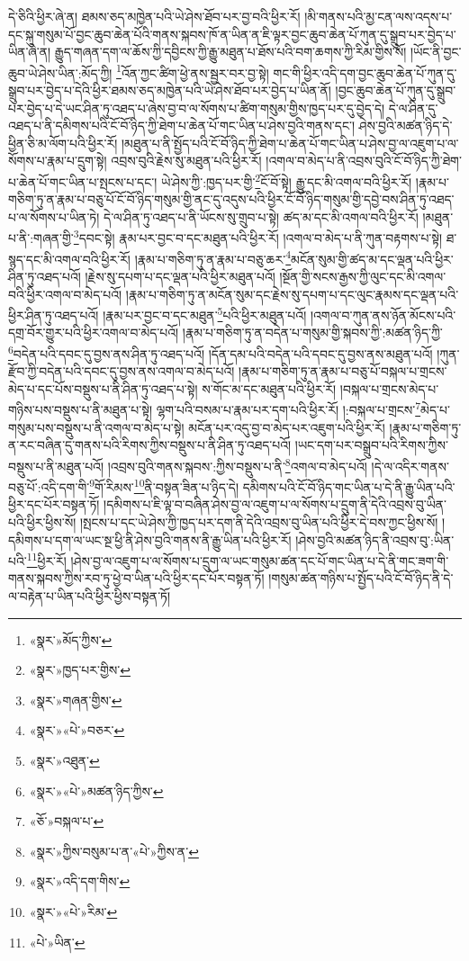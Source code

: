 དེ་ཅིའི་ཕྱིར་ཞེ་ན། ཐམས་ཅད་མཁྱེན་པའི་ཡེ་ཤེས་ཐོབ་པར་བྱ་བའི་ཕྱིར་རོ། །མི་གནས་པའི་མྱ་ངན་ལས་འདས་པ་དང་སྐུ་གསུམ་པོ་བྱང་ཆུབ་ཆེན་པོའི་གནས་སྐབས་ཁོ་ན་ཡིན་ན་ཇི་ལྟར་བྱང་ཆུབ་ཆེན་པོ་ཀུན་དུ་སྒྲུབ་པར་བྱེད་པ་ཡིན་ཞེ་ན། རྒྱུད་གཞན་དག་ལ་ཆོས་ཀྱི་དབྱིངས་ཀྱི་རྒྱུ་མཐུན་པ་ཐོས་པའི་བག་ཆགས་ཀྱི་རིམ་གྱིས་སོ། །ཡོང་ནི་བྱང་ཆུབ་ཡེ་ཤེས་ཡིན་:མོད་ཀྱི། \footnote{«སྣར་»མོད་ཀྱིས་}འོན་ཀྱང་ཚིག་ཕྱེ་ནས་སྦྱར་བར་བྱ་སྟེ། གང་གི་ཕྱིར་འདི་དག་བྱང་ཆུབ་ཆེན་པོ་ཀུན་དུ་སྒྲུབ་པར་བྱེད་པ་དེའི་ཕྱིར་ཐམས་ཅད་མཁྱེན་པའི་ཡེ་ཤེས་ཐོབ་པར་བྱེད་པ་ཡིན་ནོ། །བྱང་ཆུབ་ཆེན་པོ་ཀུན་དུ་སྒྲུབ་པར་བྱེད་པ་དེ་ཡང་ཤིན་ཏུ་འཐད་པ་ཞེས་བྱ་བ་ལ་སོགས་པ་ཚིག་གསུམ་གྱིས་ཁྱད་པར་དུ་བྱེད་དེ། དེ་ལ་ཤིན་དུ་འཐད་པ་ནི་དམིགས་པའི་ངོ་བོ་ཉིད་ཀྱི་ཐེག་པ་ཆེན་པོ་གང་ཡིན་པ་ཤེས་བྱའི་གནས་དང་། ཤེས་བྱའི་མཚན་ཉིད་དེ་ཕྱིན་ཅི་མ་ལོག་པའི་ཕྱིར་རོ། །མཐུན་པ་ནི་སྤྱོད་པའི་ངོ་བོ་ཉིད་ཀྱི་ཐེག་པ་ཆེན་པོ་གང་ཡིན་པ་ཤེས་བྱ་ལ་འཇུག་པ་ལ་སོགས་པ་རྣམ་པ་དྲུག་སྟེ། འབྲས་བུའི་རྗེས་སུ་མཐུན་པའི་ཕྱིར་རོ། །འགལ་བ་མེད་པ་ནི་འབྲས་བུའི་ངོ་བོ་ཉིད་ཀྱི་ཐེག་པ་ཆེན་པོ་གང་ཡིན་པ་སྤངས་པ་དང་། ཡེ་ཤེས་ཀྱི་:ཁྱད་པར་གྱི་\footnote{«སྣར་»ཁྱད་པར་གྱིས་}ངོ་བོ་སྟེ། རྒྱུ་དང་མི་འགལ་བའི་ཕྱིར་རོ། །རྣམ་པ་གཅིག་ཏུ་ན་རྣམ་པ་བཅུ་པོ་ངོ་བོ་ཉིད་གསུམ་གྱི་ནང་དུ་འདུས་པའི་ཕྱིར་ངོ་བོ་ཉིད་གསུམ་གྱི་དབྱེ་བས་ཤིན་ཏུ་འཐད་པ་ལ་སོགས་པ་ཡིན་ཏེ། དེ་ལ་ཤིན་ཏུ་འཐད་པ་ནི་ཡོངས་སུ་གྲུབ་པ་སྟེ། ཚད་མ་དང་མི་འགལ་བའི་ཕྱིར་རོ། །མཐུན་པ་ནི་:གཞན་གྱི་\footnote{«སྣར་»གཞན་གྱིས་}དབང་སྟེ། རྣམ་པར་བྱང་བ་དང་མཐུན་པའི་ཕྱིར་རོ། །འགལ་བ་མེད་པ་ནི་ཀུན་བརྟགས་པ་སྟེ། ཐ་སྙད་དང་མི་འགལ་བའི་ཕྱིར་རོ། །རྣམ་པ་གཅིག་ཏུ་ན་རྣམ་པ་བཅུ་ཆར་\footnote{«སྣར་»«པེ་»བཅར་}མངོན་སུམ་གྱི་ཚད་མ་དང་ལྡན་པའི་ཕྱིར་ཤིན་ཏུ་འཐད་པའོ། །རྗེས་སུ་དཔག་པ་དང་ལྡན་པའི་ཕྱིར་མཐུན་པའོ། །སྔོན་གྱི་སངས་རྒྱས་ཀྱི་ལུང་དང་མི་འགལ་བའི་ཕྱིར་འགལ་བ་མེད་པའོ། །རྣམ་པ་གཅིག་ཏུ་ན་མངོན་སུམ་དང་རྗེས་སུ་དཔག་པ་དང་ལུང་རྣམས་དང་ལྡན་པའི་ཕྱིར་ཤིན་ཏུ་འཐད་པའོ། །རྣམ་པར་བྱང་བ་དང་མཐུན་\footnote{«སྣར་»འཐུན་}པའི་ཕྱིར་མཐུན་པའོ། །འགལ་བ་ཀུན་ནས་ཉོན་མོངས་པའི་དགྲ་བོར་གྱུར་པའི་ཕྱིར་འགལ་བ་མེད་པའོ། །རྣམ་པ་གཅིག་ཏུ་ན་བདེན་པ་གསུམ་གྱི་སྐབས་ཀྱི་:མཚན་ཉིད་ཀྱི་\footnote{«སྣར་»«པེ་»མཚན་ཉིད་ཀྱིས་}བདེན་པའི་དབང་དུ་བྱས་ནས་ཤིན་ཏུ་འཐད་པའོ། །དོན་དམ་པའི་བདེན་པའི་དབང་དུ་བྱས་ནས་མཐུན་པའོ། །ཀུན་རྫོབ་ཀྱི་བདེན་པའི་དབང་དུ་བྱས་ནས་འགལ་བ་མེད་པའོ། །རྣམ་པ་གཅིག་ཏུ་ན་རྣམ་པ་བཅུ་པོ་བསྐལ་པ་གྲངས་མེད་པ་དང་པོས་བསྡུས་པ་ནི་ཤིན་ཏུ་འཐད་པ་སྟེ། ས་གོང་མ་དང་མཐུན་པའི་ཕྱིར་རོ། །བསྐལ་པ་གྲངས་མེད་པ་གཉིས་པས་བསྡུས་པ་ནི་མཐུན་པ་སྟེ། ལྷག་པའི་བསམ་པ་རྣམ་པར་དག་པའི་ཕྱིར་རོ། །:བསྐལ་པ་གྲངས་\footnote{«ཅོ་»བསྐལ་པ་}མེད་པ་གསུམ་པས་བསྡུས་པ་ནི་འགལ་བ་མེད་པ་སྟེ། མངོན་པར་འདུ་བྱ་བ་མེད་པར་འཇུག་པའི་ཕྱིར་རོ། །རྣམ་པ་གཅིག་ཏུ་ན་རང་བཞིན་དུ་གནས་པའི་རིགས་ཀྱིས་བསྡུས་པ་ནི་ཤིན་ཏུ་འཐད་པའོ། །ཡང་དག་པར་བསྒྲུབ་པའི་རིགས་ཀྱིས་བསྡུས་པ་ནི་མཐུན་པའོ། །འབྲས་བུའི་གནས་སྐབས་:ཀྱིས་བསྡུས་པ་ནི་\footnote{«སྣར་»ཀྱིས་བསུམ་པ་ན་«པེ་»ཀྱིས་ན་}འགལ་བ་མེད་པའོ། །དེ་ལ་འདིར་གནས་བཅུ་པོ་:འདི་དག་གི་\footnote{«སྣར་»འདི་དག་གིས་}གོ་རིམས་\footnote{«སྣར་»«པེ་»རིམ་}ནི་བསྟན་ཟིན་པ་ཉིད་དེ། དམིགས་པའི་ངོ་བོ་ཉིད་གང་ཡིན་པ་དེ་ནི་རྒྱུ་ཡིན་པའི་ཕྱིར་དང་པོར་བསྟན་ཏོ། །དམིགས་པ་ཇི་ལྟ་བ་བཞིན་ཤེས་བྱ་ལ་འཇུག་པ་ལ་སོགས་པ་དྲུག་ནི་དེའི་འབྲས་བུ་ཡིན་པའི་ཕྱིར་ཕྱིས་སོ། །སྤངས་པ་དང་ཡེ་ཤེས་ཀྱི་ཁྱད་པར་དག་ནི་དེའི་འབྲས་བུ་ཡིན་པའི་ཕྱིར་དེ་བས་ཀྱང་ཕྱིས་སོ། །དམིགས་པ་དག་ལ་ཡང་སྔ་ཕྱི་ནི་ཤེས་བྱའི་གནས་ནི་རྒྱུ་ཡིན་པའི་ཕྱིར་རོ། །ཤེས་བྱའི་མཚན་ཉིད་ནི་འབྲས་བུ་:ཡིན་པའི་\footnote{«པེ་»ཡིན་}ཕྱིར་རོ། །ཤེས་བྱ་ལ་འཇུག་པ་ལ་སོགས་པ་དྲུག་ལ་ཡང་གསུམ་ཚན་དང་པོ་གང་ཡིན་པ་དེ་ནི་གང་ཟག་གི་གནས་སྐབས་ཀྱིས་རབ་ཏུ་ཕྱེ་བ་ཡིན་པའི་ཕྱིར་དང་པོར་བསྟན་ཏོ། །གསུམ་ཚན་གཉིས་པ་སྤྱོད་པའི་ངོ་བོ་ཉིད་ནི་དེ་ལ་བརྟེན་པ་ཡིན་པའི་ཕྱིར་ཕྱིས་བསྟན་ཏོ། 
